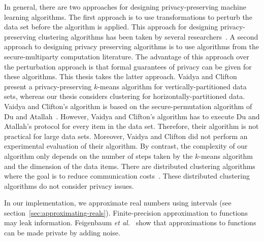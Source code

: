 
In general, there are two approaches for designing privacy-preserving
machine learning algorithms. The first approach is to use
transformations to perturb the data set before the algorithm is
applied. This approach for designing privacy-preserving clustering
algorithms has been taken by several
researchers~\cite{Klusch,MeruguGhosh,Oliveira}. A second approach to
designing privacy preserving algorithms is to use algorithms from the
secure-multiparty computation literature. The advantage of this
approach over the perturbation approach is that formal guarantees of
privacy can be given for these algorithms. This thesis takes the latter
approach. Vaidya and Clifton~\cite{VaidyaClifton} present a
privacy-preserving $k$-means algorithm for vertically-partitioned data
sets, whereas our thesis considers
clustering for horizontally-partitioned data. Vaidya and Clifton's
algorithm is based on the secure-permutation algorithm of Du and
Atallah~\cite{DuAtallah}. However, Vaidya and Clifton's algorithm has
to execute Du and Atallah's protocol for every item in the data
set. Therefore, their algorithm is not practical for large data sets.
Moreover, Vaidya and Clifton did not perform an experimental
evaluation of their algorithm.  By contrast, the complexity of our
algorithm only depends on the number of steps taken by the $k$-means
algorithm and the dimension of the data items. There are distributed
clustering algorithms where the goal is to reduce communication
costs~\cite{DhillonModha,Kargupta}.  These distributed clustering
algorithms do not consider privacy issues.

In our implementation, we approximate real numbers using intervals
(see section~\ref{sec:approximating-reals}).  Finite-precision
approximation to functions may leak information. Feigenbaum {\it et
al.}~\cite{Nissim:2001} show that approximations to functions can be
made private by adding noise.
